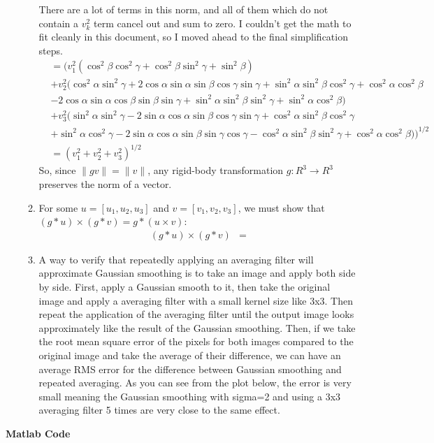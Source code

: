 \documentclass[12pt]{article}
\begin{document}
\begin{enumerate}
\begin{enumerate}
		There are a lot of terms in this norm, and all of them which do not contain a $v_k^2$ term cancel out and sum to zero. I couldn't get the math to fit cleanly in this document, so I moved ahead to the final simplification steps.
		\begin{align*}
		&= \big(v_1^2(\cos^2\beta\cos^2\gamma + \cos^2\beta\sin^2\gamma + \sin^2\beta) \\
		&+ v_2^2 (\cos^2\alpha\sin^2\gamma + 2\cos\alpha\sin\alpha\sin\beta\cos\gamma\sin\gamma + \sin^2\alpha \sin^2\beta\cos^2\gamma + \cos^2\alpha\cos^2\beta \\
		&- 2\cos\alpha\sin\alpha\cos\beta\sin\beta\sin\gamma + \sin^2\alpha\sin^2\beta\sin^2\gamma + \sin^2\alpha\cos^2\beta) \\
		&+ v_3^2 (\sin^2\alpha\sin^2\gamma - 2\sin\alpha\cos\alpha\sin\beta\cos\gamma\sin\gamma + \cos^2\alpha\sin^2\beta\cos^2\gamma \\ &+ \sin^2\alpha\cos^2\gamma - 2 \sin\alpha\cos\alpha\sin\beta\sin\gamma\cos\gamma - \cos^2\alpha\sin^2\beta\sin^2\gamma + \cos^2\alpha\cos^2\beta) \big)^{1/2} \\
		&= (v_1^2 + v_2^2 + v_3^2)^{1/2} 
		\end{align*}
		So, since $\|gv\| = \|v\|$, any rigid-body transformation $g: R^3 \rightarrow R^3$ preserves the norm of a vector.
		\item For some  $u = [u_1, u_2, u_3]$ and $v = [v_1, v_2, v_3]$, we must show that $(g * u) \times (g * v) = g * (u \times v)$:
		\begin{align*}
		(g * u) \times (g * v) &=
		\end{align*}
		\item A way to verify that repeatedly applying an averaging filter will approximate Gaussian smoothing is to take an image and apply both side by side. First, apply a Gaussian smooth to it, then take the original image and apply a averaging filter with a small kernel size like 3x3. Then repeat the application of the averaging filter until the output image looks approximately like the result of the Gaussian smoothing. Then, if we take the root mean square error of the pixels for both images compared to the original image and take the average of their difference, we can have an average RMS error for the difference between Gaussian smoothing and repeated averaging. As you can see from the plot below, the error is very small meaning the Gaussian smoothing with sigma=2 and using a 3x3 averaging filter 5 times are very close to the same effect. \\
		
	\end{enumerate}
\end{enumerate}
\newpage
\textbf{Matlab Code}
%
\end{document}
